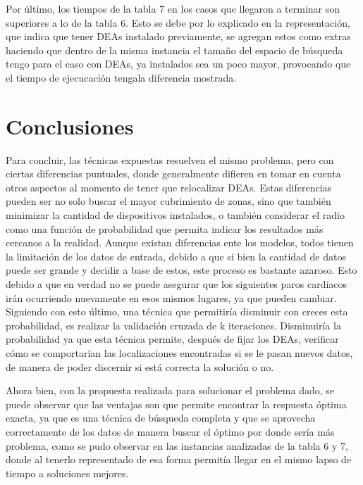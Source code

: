 \documentclass[letter, 10pt]{article}
\begin{document}
Por \'ultimo, los tiempos de la tabla 7 en los casos que llegaron a terminar son superiores a lo de la tabla 6. Esto se debe por lo explicado en la representaci\'on, que indica que tener DEAs instalado previamente, se agregan estos como extras haciendo que dentro de la misma instancia el tama\~no del espacio de b\'usqueda tengo para el caso con DEAs, ya instalados sea un poco mayor, provocando que el tiempo de ejecucaci\'on tengala diferencia mostrada.

\section{Conclusiones}

Para concluir, las t\'ecnicas expuestas resuelven el mismo problema, pero con ciertas diferencias puntuales, donde generalmente difieren en tomar en cuenta otros aspectos al momento de tener que relocalizar DEAs. Estas diferencias pueden ser no solo buscar el mayor cubrimiento de zonas, sino que tambi\'en minimizar la cantidad de dispositivos instalados, o tambi\'en considerar el radio como una funci\'on de probabilidad que permita indicar los resultados m\'as cercanos a la realidad. Aunque existan diferencias ente los modelos, todos tienen la limitaci\'on de los datos de entrada, debido a que si bien la cantidad de datos puede ser grande y decidir a base de estos, este proceso es bastante azaroso. Esto debido a que en verdad no se puede asegurar que los siguientes paros card\'iacos ir\'an ocurriendo nuevamente en esos mismos lugares, ya que pueden cambiar. Siguiendo con esto \'ultimo, una t\'ecnica que permitir\'ia disminuir con creces esta probabilidad, es realizar la validaci\'on cruzada de k iteraciones. Disminuir\'ia la probabilidad ya que esta t\'ecnica permite, despu\'es de fijar los DEAs, verificar c\'omo se comportar\'ian las localizaciones encontradas si se le pasan nuevos datos, de manera de poder discernir si est\'a correcta la soluci\'on o no.

Ahora bien, con la propuesta realizada para solucionar el problema dado, se puede observar que las ventajas son que permite encontrar la respuesta \'optima exacta, ya que es una t\'ecnica de b\'usqueda completa y que se aprovecha correctamente de los datos de manera buscar el \'optimo por donde ser\'ia m\'as problema, como se pudo observar en las instancias analizadas de la tabla 6 y 7, donde al tenerlo representado de esa forma permit\'ia llegar en el mismo lapso de tiempo a soluciones mejores. 
\end{document}
